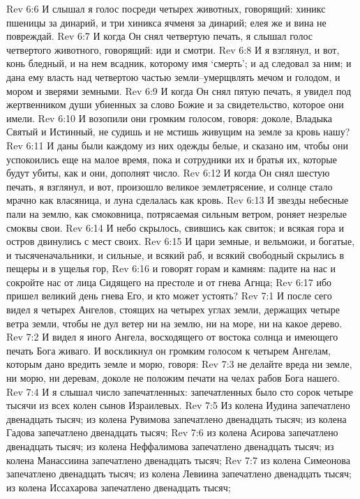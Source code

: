 Rev 6:6  И слышал я голос посреди четырех животных, говорящий: хиникс пшеницы за динарий, и три хиникса ячменя за динарий; елея же и вина не повреждай.
Rev 6:7  И когда Он снял четвертую печать, я слышал голос четвертого животного, говорящий: иди и смотри.
Rev 6:8  И я взглянул, и вот, конь бледный, и на нем всадник, которому имя `смерть'; и ад следовал за ним; и дана ему власть над четвертою частью земли--умерщвлять мечом и голодом, и мором и зверями земными.
Rev 6:9  И когда Он снял пятую печать, я увидел под жертвенником души убиенных за слово Божие и за свидетельство, которое они имели.
Rev 6:10  И возопили они громким голосом, говоря: доколе, Владыка Святый и Истинный, не судишь и не мстишь живущим на земле за кровь нашу?
Rev 6:11  И даны были каждому из них одежды белые, и сказано им, чтобы они успокоились еще на малое время, пока и сотрудники их и братья их, которые будут убиты, как и они, дополнят число.
Rev 6:12  И когда Он снял шестую печать, я взглянул, и вот, произошло великое землетрясение, и солнце стало мрачно как власяница, и луна сделалась как кровь.
Rev 6:13  И звезды небесные пали на землю, как смоковница, потрясаемая сильным ветром, роняет незрелые смоквы свои.
Rev 6:14  И небо скрылось, свившись как свиток; и всякая гора и остров двинулись с мест своих.
Rev 6:15  И цари земные, и вельможи, и богатые, и тысяченачальники, и сильные, и всякий раб, и всякий свободный скрылись в пещеры и в ущелья гор,
Rev 6:16  и говорят горам и камням: падите на нас и сокройте нас от лица Сидящего на престоле и от гнева Агнца;
Rev 6:17  ибо пришел великий день гнева Его, и кто может устоять?
Rev 7:1  И после сего видел я четырех Ангелов, стоящих на четырех углах земли, держащих четыре ветра земли, чтобы не дул ветер ни на землю, ни на море, ни на какое дерево.
Rev 7:2  И видел я иного Ангела, восходящего от востока солнца и имеющего печать Бога живаго. И воскликнул он громким голосом к четырем Ангелам, которым дано вредить земле и морю, говоря:
Rev 7:3  не делайте вреда ни земле, ни морю, ни деревам, доколе не положим печати на челах рабов Бога нашего.
Rev 7:4  И я слышал число запечатленных: запечатленных было сто сорок четыре тысячи из всех колен сынов Израилевых.
Rev 7:5  Из колена Иудина запечатлено двенадцать тысяч; из колена Рувимова запечатлено двенадцать тысяч; из колена Гадова запечатлено двенадцать тысяч;
Rev 7:6  из колена Асирова запечатлено двенадцать тысяч; из колена Неффалимова запечатлено двенадцать тысяч; из колена Манассиина запечатлено двенадцать тысяч;
Rev 7:7  из колена Симеонова запечатлено двенадцать тысяч; из колена Левиина запечатлено двенадцать тысяч; из колена Иссахарова запечатлено двенадцать тысяч;
